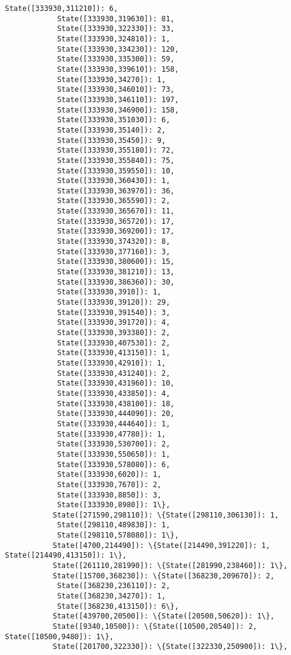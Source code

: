 \documentclass[11pt]{article}
\begin{document}
\begin{Verbatim}[commandchars=\\\{\}]
            State([333930,311210]): 6,
            State([333930,319630]): 81,
            State([333930,322330]): 33,
            State([333930,324810]): 1,
            State([333930,334230]): 120,
            State([333930,335300]): 59,
            State([333930,339610]): 158,
            State([333930,34270]): 1,
            State([333930,346010]): 73,
            State([333930,346110]): 197,
            State([333930,346900]): 158,
            State([333930,351030]): 6,
            State([333930,35140]): 2,
            State([333930,35450]): 9,
            State([333930,355180]): 72,
            State([333930,355840]): 75,
            State([333930,359550]): 10,
            State([333930,360430]): 1,
            State([333930,363970]): 36,
            State([333930,365590]): 2,
            State([333930,365670]): 11,
            State([333930,365720]): 17,
            State([333930,369200]): 17,
            State([333930,374320]): 8,
            State([333930,377160]): 3,
            State([333930,380600]): 15,
            State([333930,381210]): 13,
            State([333930,386360]): 30,
            State([333930,3910]): 1,
            State([333930,39120]): 29,
            State([333930,391540]): 3,
            State([333930,391720]): 4,
            State([333930,393380]): 2,
            State([333930,407530]): 2,
            State([333930,413150]): 1,
            State([333930,42910]): 1,
            State([333930,431240]): 2,
            State([333930,431960]): 10,
            State([333930,433850]): 4,
            State([333930,438100]): 18,
            State([333930,444090]): 20,
            State([333930,444640]): 1,
            State([333930,47780]): 1,
            State([333930,530700]): 2,
            State([333930,550650]): 1,
            State([333930,578080]): 6,
            State([333930,6020]): 1,
            State([333930,7670]): 2,
            State([333930,8850]): 3,
            State([333930,8980]): 1\},
           State([271590,298110]): \{State([298110,306130]): 1,
            State([298110,489830]): 1,
            State([298110,578080]): 1\},
           State([4700,214490]): \{State([214490,391220]): 1, State([214490,413150]): 1\},
           State([261110,281990]): \{State([281990,238460]): 1\},
           State([15700,368230]): \{State([368230,209670]): 2,
            State([368230,236110]): 2,
            State([368230,34270]): 1,
            State([368230,413150]): 6\},
           State([439700,20500]): \{State([20500,50620]): 1\},
           State([9340,10500]): \{State([10500,20540]): 2, State([10500,9480]): 1\},
           State([201700,322330]): \{State([322330,250900]): 1\},

\end{Verbatim}
\end{document}

